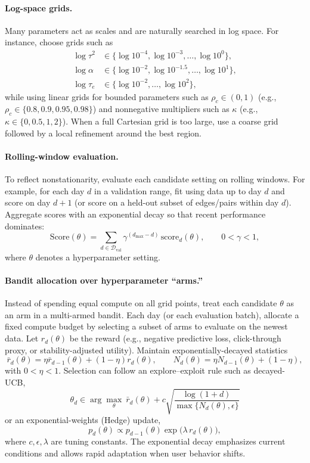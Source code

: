 \documentclass[11pt]{article}
\begin{document}
\paragraph{Log-space grids.}
Many parameters act as scales and are naturally searched in log space.
For instance, choose grids such as
\[
\begin{aligned}
\log \tau^2 &\in \{\log 10^{-4},\log 10^{-3},\dots,\log 10^{0}\},\\
\log \alpha &\in \{\log 10^{-2},\log 10^{-1.5},\dots,\log 10^{1}\},\\
\log \tau_e &\in \{\log 10^{-2},\dots,\log 10^{2}\},
\end{aligned}
\]
while using linear grids for bounded parameters such as $\rho_c\in(0,1)$ (e.g., $\rho_c\in\{0.8,0.9,0.95,0.98\}$)
and nonnegative multipliers such as $\kappa$ (e.g., $\kappa\in\{0,0.5,1,2\}$).
When a full Cartesian grid is too large, use a coarse grid followed by a local refinement around the best region.

\paragraph{Rolling-window evaluation.}
To reflect nonstationarity, evaluate each candidate setting on rolling windows.
For example, for each day $d$ in a validation range, fit using data up to day $d$ and score on day $d+1$
(or score on a held-out subset of edges/pairs within day $d$).
Aggregate scores with an exponential decay so that recent performance dominates:
\[
\mathrm{Score}(\theta)
=
\sum_{d\in\mathcal D_{\mathrm{val}}} \gamma^{(d_{\max}-d)}\,\mathrm{score}_d(\theta),
\qquad 0<\gamma<1,
\]
where $\theta$ denotes a hyperparameter setting.

\paragraph{Bandit allocation over hyperparameter ``arms.''}
Instead of spending equal compute on all grid points, treat each candidate $\theta$ as an arm in a multi-armed bandit.
Each day (or each evaluation batch), allocate a fixed compute budget by selecting a subset of arms to evaluate on the newest data.
Let $r_d(\theta)$ be the reward (e.g., negative predictive loss, click-through proxy, or stability-adjusted utility).
Maintain exponentially-decayed statistics
\[
\bar r_d(\theta)=\eta\bar r_{d-1}(\theta)+(1-\eta)r_d(\theta),
\qquad
N_d(\theta)=\eta N_{d-1}(\theta)+(1-\eta),
\]
with $0<\eta<1$.
Selection can follow an explore--exploit rule such as decayed-UCB,
\[
\theta_d\in\arg\max_{\theta}\ \bar r_d(\theta)+c\sqrt{\frac{\log(1+d)}{\max\{N_d(\theta),\epsilon\}}}
\]
or an exponential-weights (Hedge) update,
\[
p_d(\theta)\propto p_{d-1}(\theta)\exp\big(\lambda\,r_d(\theta)\big),
\]
where $c,\epsilon,\lambda$ are tuning constants.
The exponential decay emphasizes current conditions and allows rapid adaptation when user behavior shifts.
\end{document}
